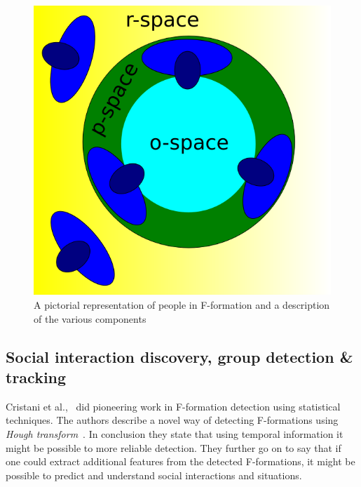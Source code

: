 \begin{figure}[H]
  \begin{center}
    \includegraphics[scale=.45]{figures/o-p-r-space}
    \caption{A pictorial representation of people in F-formation and a
      description of the various components}
    \label{fig:f-formation}
  \end{center}
\end{figure}

\subsection{Social interaction discovery, group detection \& tracking}

Cristani et al.,~\cite{DBLP:conf/bmvc/CristaniBPFTBMM11} did
pioneering work in F-formation detection using statistical
techniques. The authors describe a novel way of detecting F-formations
using \emph{Hough transform}~\cite{Duda:1972:UHT:361237.361242}. In
conclusion they state that using temporal information it might be
possible to more reliable detection. They further go on to say that if
one could extract additional features from the detected F-formations,
it might be possible to predict and understand social interactions and
situations.


